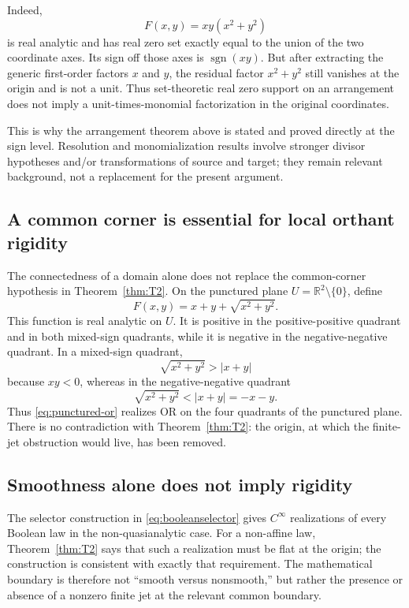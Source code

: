 \documentclass[11pt]{article}
\theoremstyle{definition}
\theoremstyle{remark}
\newcommand{\R}{\mathbb{R}}
\newcommand{\sign}{\operatorname{sgn}}
\begin{document}
Indeed,
\begin{equation}\label{eq:weak-support-example}
 F(x,y)=xy(x^2+y^2)
\end{equation}
is real analytic and has real zero set exactly equal to the union of the two coordinate axes. Its sign off those axes is $\sign(xy)$. But after extracting the generic first-order factors $x$ and $y$, the residual factor $x^2+y^2$ still vanishes at the origin and is not a unit. Thus set-theoretic real zero support on an arrangement does not imply a unit-times-monomial factorization in the original coordinates.

This is why the arrangement theorem above is stated and proved directly at the sign level. Resolution and monomialization results involve stronger divisor hypotheses and/or transformations of source and target; they remain relevant background, not a replacement for the present argument.

\subsection{A common corner is essential for local orthant rigidity}

The connectedness of a domain alone does not replace the common-corner hypothesis in Theorem~\ref{thm:T2}. On the punctured plane $U=\R^2\setminus\{0\}$, define
\begin{equation}\label{eq:punctured-or}
 F(x,y)=x+y+\sqrt{x^2+y^2}.
\end{equation}
This function is real analytic on $U$. It is positive in the positive-positive quadrant and in both mixed-sign quadrants, while it is negative in the negative-negative quadrant. In a mixed-sign quadrant,
\[
 \sqrt{x^2+y^2}>|x+y|
\]
because $xy<0$, whereas in the negative-negative quadrant
\[
 \sqrt{x^2+y^2}<|x+y|=-x-y.
\]
Thus \eqref{eq:punctured-or} realizes OR on the four quadrants of the punctured plane. There is no contradiction with Theorem~\ref{thm:T2}: the origin, at which the finite-jet obstruction would live, has been removed.

\subsection{Smoothness alone does not imply rigidity}

The selector construction in \eqref{eq:booleanselector} gives $C^\infty$ realizations of every Boolean law in the non-quasianalytic case. For a non-affine law, Theorem~\ref{thm:T2} says that such a realization must be flat at the origin; the construction is consistent with exactly that requirement. The mathematical boundary is therefore not ``smooth versus nonsmooth,'' but rather the presence or absence of a nonzero finite jet at the relevant common boundary.
\end{document}
